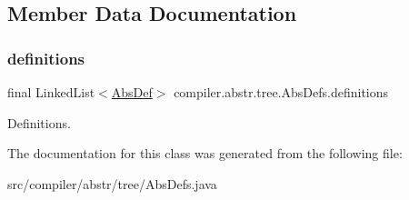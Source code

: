 \subsection{Member Data Documentation}
\mbox{\label{classcompiler_1_1abstr_1_1tree_1_1_abs_defs_a831952661ca84cbf1c97a84f9532b9ca}} 
\subsubsection{\texorpdfstring{definitions}{definitions}}
{\footnotesize\ttfamily final Linked\+List$<$\hyperlink{classcompiler_1_1abstr_1_1tree_1_1def_1_1_abs_def}{Abs\+Def}$>$ compiler.\+abstr.\+tree.\+Abs\+Defs.\+definitions}

Definitions. 

The documentation for this class was generated from the following file\+:\begin{DoxyCompactItemize}
\item 
src/compiler/abstr/tree/Abs\+Defs.\+java\end{DoxyCompactItemize}
